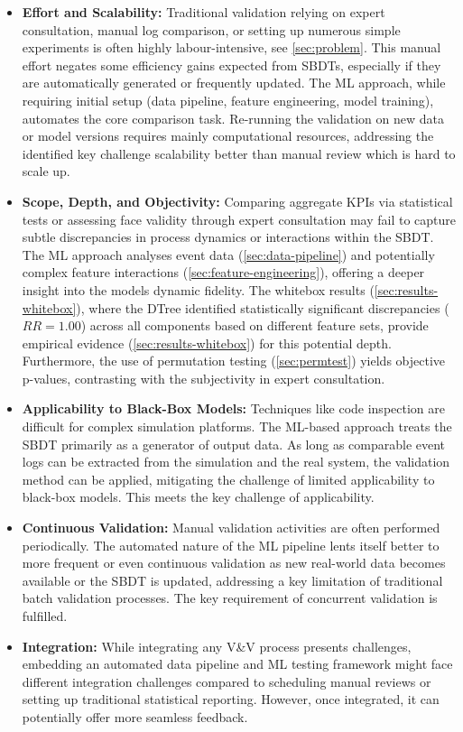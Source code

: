 \begin{itemize}
  \item \textbf{Effort and Scalability:} Traditional validation relying on expert consultation, manual log comparison, or setting up numerous simple experiments is often highly labour-intensive, see \autoref{sec:problem}. This manual effort negates some efficiency gains expected from SBDTs, especially if they are automatically generated or frequently updated. The ML approach, while requiring initial setup (data pipeline, feature engineering, model training), automates the core comparison task. Re-running the validation on new data or model versions requires mainly computational resources, addressing the identified key challenge scalability better than manual review which is hard to scale up.

  \item \textbf{Scope, Depth, and Objectivity:} Comparing aggregate KPIs via statistical tests or assessing face validity through expert consultation may fail to capture subtle discrepancies in process dynamics or interactions within the SBDT. The ML approach analyses event data (\autoref{sec:data-pipeline}) and potentially complex feature interactions (\autoref{sec:feature-engineering}), offering a deeper insight into the models dynamic fidelity. The whitebox results (\autoref{sec:results-whitebox}), where the DTree identified statistically significant discrepancies ($RR=1.00$) across all components based on different feature sets, provide empirical evidence (\autoref{sec:results-whitebox}) for this potential depth. Furthermore, the use of permutation testing (\autoref{sec:permtest}) yields objective p-values, contrasting with the subjectivity in expert consultation.

  \item \textbf{Applicability to Black-Box Models:} Techniques like code inspection are difficult for complex simulation platforms. The ML-based approach treats the SBDT primarily as a generator of output data. As long as comparable event logs can be extracted from the simulation and the real system, the validation method can be applied, mitigating the challenge of limited applicability to black-box models. This meets the key challenge of applicability.

  \item \textbf{Continuous Validation:} Manual validation activities are often performed periodically. The automated nature of the ML pipeline lents itself better to more frequent or even continuous validation as new real-world data becomes available or the SBDT is updated, addressing a key limitation of traditional batch validation processes. The key requirement of concurrent validation is fulfilled.

  \item \textbf{Integration:} While integrating any V\&V process presents challenges, embedding an automated data pipeline and ML testing framework might face different integration challenges compared to scheduling manual reviews or setting up traditional statistical reporting. However, once integrated, it can potentially offer more seamless feedback.
\end{itemize}

